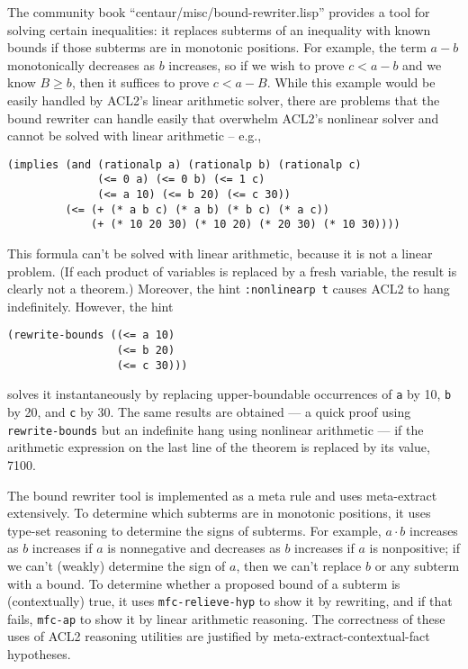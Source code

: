 The community book ``centaur/misc/bound-rewriter.lisp'' provides a
tool for solving certain inequalities: it replaces subterms of an
inequality with known bounds if those subterms are in monotonic
positions.  For example, the term $a-b$ monotonically decreases as $b$
increases, so if we wish to prove $c<a-b$ and we know $B \geq b$, then
it suffices to prove $c<a-B$.  While this example would be easily
handled by ACL2's linear arithmetic solver, there are problems that
the bound rewriter can handle easily that overwhelm ACL2's nonlinear
solver and cannot be solved with linear arithmetic -- e.g.,
\begin{verbatim}
(implies (and (rationalp a) (rationalp b) (rationalp c)
              (<= 0 a) (<= 0 b) (<= 1 c)
              (<= a 10) (<= b 20) (<= c 30))
         (<= (+ (* a b c) (* a b) (* b c) (* a c))
             (+ (* 10 20 30) (* 10 20) (* 20 30) (* 10 30))))
\end{verbatim}
This formula can't be solved with linear arithmetic, because it is not a
linear problem.  (If each product of variables is replaced by a fresh
variable, the result is clearly not a theorem.)
Moreover, the hint \texttt{:nonlinearp t} causes ACL2 to hang indefinitely.
However, the hint
\begin{verbatim}
(rewrite-bounds ((<= a 10)
                 (<= b 20)
                 (<= c 30)))
\end{verbatim}
solves it instantaneously by replacing upper-boundable occurrences of
\texttt{a} by 10, \texttt{b} by 20, and \texttt{c} by 30.  The same
results are obtained --- a quick proof using {\tt rewrite-bounds} but
an indefinite hang using nonlinear arithmetic --- if the arithmetic
expression on the last line of the theorem is replaced by its value,
7100.

The bound rewriter tool is implemented as a meta rule and uses
meta-extract extensively.  To determine which subterms are in
monotonic positions, it uses type-set reasoning to determine the signs
of subterms.  For example, $a \cdot b$ increases as $b$ increases if
$a$ is nonnegative and decreases as $b$ increases if $a$ is
nonpositive; if we can't (weakly) determine the sign of $a$, then we
can't replace $b$ or any subterm with a bound.  To determine whether a
proposed bound of a subterm is (contextually) true, it uses
\texttt{mfc-relieve-hyp} to show it by rewriting, and if that fails,
\texttt{mfc-ap} to show it by linear arithmetic reasoning.  The
correctness of these uses of ACL2 reasoning utilities are justified by
meta-extract-contextual-fact hypotheses.

